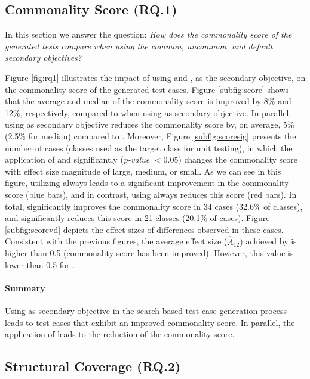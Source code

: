 \subsection{Commonality Score (RQ.1)}

In this section we answer the question: \emph{How does the \emph{commonality score} of the generated tests compare when using the \textit{common}, \textit{uncommon}, and \textit{default} secondary objectives?}

Figure \ref{fig:rq1} illustrates the impact of using \com and \ucom, as the secondary objective, on the commonality score of the generated test cases. Figure \ref{subfig:score} shows that the average and median of the commonality score is improved by 8\% and 12\%, respectively, compared to \df when using \com as secondary objective.
In parallel, using \ucom as secondary objective reduces the commonality score by, on average, 5\% (2.5\% for median) compared to \df. Moreover, Figure \ref{subfig:scoresig} presents the number of cases (\ie classes used as the target class for unit testing), in which the application of \com and \ucom significantly (\textit{p-value} $<0.05$) changes the commonality score with effect size magnitude of large, medium, or small. As we can see in this figure, utilizing \com always leads to a significant improvement in the commonality score (blue bars), and in contrast, using \ucom always reduces this score (red bars). In total, \com significantly improves the commonality score in 34 cases (32.6\% of classes), and \ucom significantly reduces this score in 21 classes (20.1\% of cases). Figure \ref{subfig:scorevd} depicts the effect sizes of differences observed in these cases. Consistent with the previous figures, the average effect size ($\widehat{A}_{12}$) achieved by \com is higher than 0.5 (\ie commonality score has been improved). However, this value is lower than 0.5 for \ucom.

\paragraph{Summary} Using \com as secondary objective in the \evosuite search-based test case generation process leads to test cases that exhibit an improved commonality score. In parallel, the application of \ucom leads to the reduction of the commonality score.

\subsection{Structural Coverage (RQ.2)}

